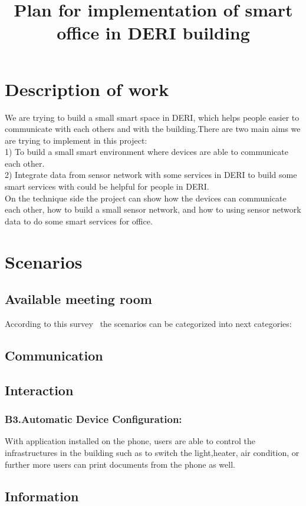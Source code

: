 \documentclass[a4paper]{llncs}
\begin{document}
\title{Plan for implementation of smart office in DERI building}
\maketitle
\section{Description of work}
We are trying to build a small smart space in DERI, which helps people easier to communicate with each others and with the building.There are two main aims we are trying to implement in this project:\\
1) To build a small smart environment where devices are able to communicate each other.\\
2) Integrate data from sensor network with some services in DERI to build some smart services with could be helpful for people in DERI.\\
On the technique side the project can show how the devices can communicate each other, how to build a small sensor network, and how to using sensor network data to do some smart services for office.
\section{Scenarios}

\subsection{Available meeting room}



According to this survey~\cite{survey:2010} the scenarios can be categorized into next categories:
\subsection{Communication}
\subsection{Interaction}
\subsubsection{B3.Automatic Device Configuration:}
With application installed on the phone, users are able to control the infrastructures in the building such as  to switch the light,heater, air condition, or further more users can print documents from the phone as well.
\subsection{Information}
\end{document}
